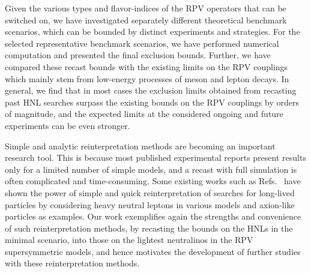 Given the various types and flavor-indices of the RPV operators that can be switched on, we have 
investigated separately different theoretical benchmark scenarios, which can be bounded by distinct 
experiments and strategies. For the selected representative benchmark scenarios, we have performed 
numerical computation and presented the final exclusion bounds. Further, we have compared these 
recast bounds with the existing limits on the RPV couplings which mainly stem from low-energy 
processes of meson and lepton decays. In general, we find that in most cases the exclusion limits 
obtained from recasting past HNL searches surpass the existing bounds on the RPV 
couplings by orders of magnitude, and the expected limits at the considered ongoing and future 
experiments can be even stronger.



Simple and analytic reinterpretation methods are becoming an important research tool.
This is because most published experimental reports present results only for a limited number of simple models, and a recast with full simulation is often complicated and time-consuming.
Some existing works such as Refs.~\cite{Fernandez-Martinez:2023phj, Barouki:2022bkt, Beltran:2023nli} have shown the power of simple and quick reinterpretation of searches for long-lived particles by considering heavy neutral leptons in various models and axion-like particles as examples.
Our work exemplifies again the strengths and convenience of such reinterpretation methods, by recasting the bounds on the HNLs in the minimal scenario, into those on the lightest neutralinos in the RPV supersymmetric models, and hence motivates the development of further studies with these reinterpretation methods.




